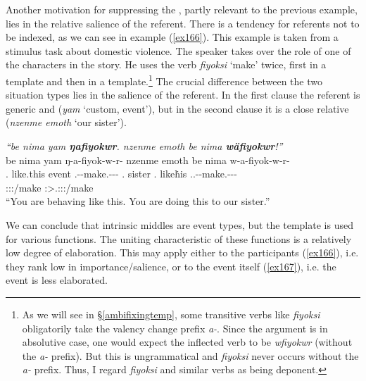 Another motivation for suppressing the , partly relevant to the previous example, lies in the relative salience of the referent. There is a tendency for  referents not to be indexed, as we can see in example (\ref{ex166}). This example is taken from a stimulus task about domestic violence. The speaker takes over the role of one of the characters in the story. He uses the verb \emph{fiyoksi} `make' twice, first in a  template and then in a  template.\footnote{As we will see in \S{}\ref{ambifixingtemp}, some transitive verbs like \emph{fiyoksi} obligatorily take the valency change prefix \emph{a-}. Since the argument is in absolutive case, one would expect the inflected verb to be \emph{wfiyokwr} (without the \emph{a-} prefix). But this is ungrammatical and \emph{fiyoksi} never occurs without the \emph{a-} prefix. Thus, I regard \emph{fiyoksi} and similar verbs as being deponent.} The crucial difference between the two situation types lies in the salience of the referent. In the first clause the referent is generic and  (\emph{yam} `custom, event'), but in the second clause it is a close relative (\emph{nzenme emoth} `our sister').

\begin{exe}
	\ex \emph{``be nima yam \textbf{ŋafiyokwr}. nzenme emoth be nima \textbf{wäfiyokwr}!''}\\
	\glll be nima yam ŋ-a-fiyok-w-r-\Zero{} nzenme emoth be nima w-a-fiyok-w-r-\Zero{}\\
	\Ssg.\Erg{} like.this event \M.\Alph-\Vc-make.\Ext-\Ndu-\Lk-\Stsg{} \Fnsg.\Poss{} sister \Ssg.\Erg{} like\.his \Tsg.\F.\Alph-\Vc-make.\Ext-\Ndu-\Lk-\Stsg\\
	{} {} {} \footnotesize{\Stsg:\Sbj:\Nonpast:\Ipfv/make} {} {} {} {} \footnotesize{\Stsg:\Sbj>\Tsg.\F:\Obj:\Nonpast:\Ipfv/make}\\
	\trans ``You are behaving like this. You are doing this to our sister.''\\ 
	\label{ex166}
\end{exe}

We can conclude that intrinsic middles are  event types, but the  template is used for various functions. The uniting characteristic of these functions is a relatively low degree of elaboration. This may apply either to the participants (\ref{ex166}), i.e. they rank low in importance/salience, or to the event itself (\ref{ex167}), i.e. the event is less elaborated.

